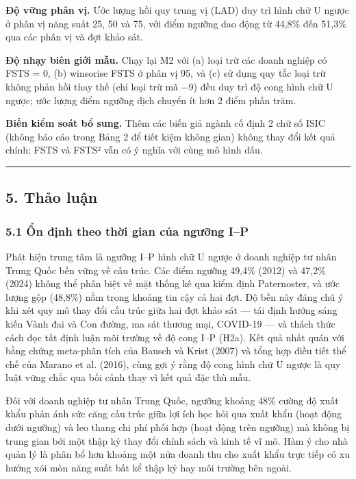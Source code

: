 \documentclass[12pt,a4paper]{article}
\begin{document}
\textbf{Độ vững phân vị.} Ước lượng hồi quy trung vị (LAD) duy trì hình
chữ U ngược ở phân vị năng suất 25, 50 và 75, với điểm ngưỡng dao động
từ 44,8\% đến 51,3\% qua các phân vị và đợt khảo sát.

\textbf{Độ nhạy biên giới mẫu.} Chạy lại M2 với (a) loại trừ các doanh
nghiệp có FSTS = 0, (b) winsorise FSTS ở phân vị 95, và (c) sử dụng quy
tắc loại trừ không phản hồi thay thế (chỉ loại trừ mã −9) đều duy trì độ
cong hình chữ U ngược; ước lượng điểm ngưỡng dịch chuyển ít hơn 2 điểm
phần trăm.

\textbf{Biến kiểm soát bổ sung.} Thêm các biến giả ngành cố định 2 chữ
số ISIC (không báo cáo trong Bảng 2 để tiết kiệm không gian) không thay
đổi kết quả chính; FSTS và FSTS² vẫn có ý nghĩa với cùng mô hình dấu.

\begin{center}\rule{0.5\linewidth}{0.5pt}\end{center}

\hypertarget{5-thux1ea3o-luux1eadn}{%
\subsection{5. Thảo luận}\label{5-thux1ea3o-luux1eadn}}

\hypertarget{51-ux1ed5n-ux111ux1ecbnh-theo-thux1eddi-gian-cux1ee7a-ngux1b0ux1ee1ng-ip}{%
\subsubsection{5.1 Ổn định theo thời gian của ngưỡng
I--P}\label{51-ux1ed5n-ux111ux1ecbnh-theo-thux1eddi-gian-cux1ee7a-ngux1b0ux1ee1ng-ip}}

Phát hiện trung tâm là ngưỡng I--P hình chữ U ngược ở doanh nghiệp tư
nhân Trung Quốc bền vững về cấu trúc. Các điểm ngưỡng 49,4\% (2012) và
47,2\% (2024) không thể phân biệt về mặt thống kê qua kiểm định
Paternoster, và ước lượng gộp (48,8\%) nằm trong khoảng tin cậy cả hai
đợt. Độ bền này đáng chú ý khi xét quy mô thay đổi cấu trúc giữa hai đợt
khảo sát --- tái định hướng sáng kiến Vành đai và Con đường, ma sát
thương mại, COVID-19 --- và thách thức cách đọc tất định luận môi trường
về độ cong I--P (H2a). Kết quả nhất quán với bằng chứng meta-phân tích
của Bausch và Krist (2007) và tổng hợp điều tiết thể chế của Marano et
al. (2016), cùng gợi ý rằng độ cong hình chữ U ngược là quy luật vững
chắc qua bối cảnh thay vì kết quả đặc thù mẫu.

Đối với doanh nghiệp tư nhân Trung Quốc, ngưỡng khoảng 48\% cường độ
xuất khẩu phản ánh sức căng cấu trúc giữa lợi ích học hỏi qua xuất khẩu
(hoạt động dưới ngưỡng) và leo thang chi phí phối hợp (hoạt động trên
ngưỡng) mà không bị trung gian bởi một thập kỷ thay đổi chính sách và
kinh tế vĩ mô. Hàm ý cho nhà quản lý là phân bổ hơn khoảng một nửa doanh
thu cho xuất khẩu trực tiếp có xu hướng xói mòn năng suất bất kể thập kỷ
hay môi trường bên ngoài.
\end{document}
